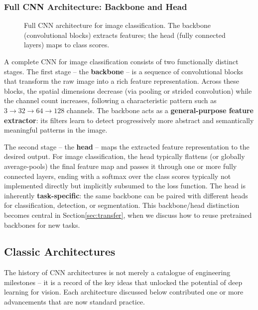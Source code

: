 \subsubsection{Full CNN Architecture: Backbone and Head}

\begin{figure}
    \centering
    \resizebox{0.48\textwidth}{!}{}
    \caption{Full CNN architecture for image classification. The backbone (convolutional blocks) extracts features; the head (fully connected layers) maps to class scores.}
    \label{fig:cnn_architecture}
\end{figure}

A complete CNN for image classification consists of two functionally distinct stages. The first stage -- the \textbf{backbone} -- is a sequence of convolutional blocks that transform the raw image into a rich feature representation. Across these blocks, the spatial dimensions decrease (via pooling or strided convolution) while the channel count increases, following a characteristic pattern such as $3 \to 32 \to 64 \to 128$ channels. The backbone acts as a \textbf{general-purpose feature extractor}: its filters learn to detect progressively more abstract and semantically meaningful patterns in the image.

The second stage -- the \textbf{head} -- maps the extracted feature representation to the desired output. For image classification, the head typically flattens (or globally average-pools) the final feature map and passes it through one or more fully connected layers, ending with a softmax over the class scores typically not implemented directly but implicitly subsumed to the loss function. The head is inherently \textbf{task-specific}: the same backbone can be paired with different heads for classification, detection, or segmentation. This backbone/head distinction becomes central in Section\ref{sec:transfer}, when we discuss how to reuse pretrained backbones for new tasks.

\subsection{Classic Architectures}
\label{sec:cnns:architectures}


The history of CNN architectures is not merely a catalogue of engineering milestones -- it is a record of the key ideas that unlocked the potential of deep learning for vision. Each architecture discussed below contributed one or more advancements that are now standard practice.

